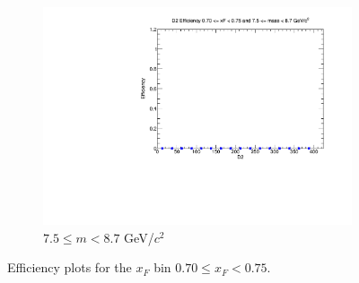 \begin{figure}[p]
\begin{subfigure}[b]{0.32\textwidth}
        \includegraphics[width=\textwidth]{./kTrackerEfficiencyPlots/D2_Efficiency_xF14_mass10.pdf}
        \caption{$7.5 \leq m < 8.7$ GeV/$c^2$}
        \label{fig:xF14_mass10}
    \end{subfigure}
    \hfill
    \caption{Efficiency plots for the $x_F$ bin $0.70 \leq x_F < 0.75$.}
    \label{fig:xF14}
\end{figure}

\clearpage

